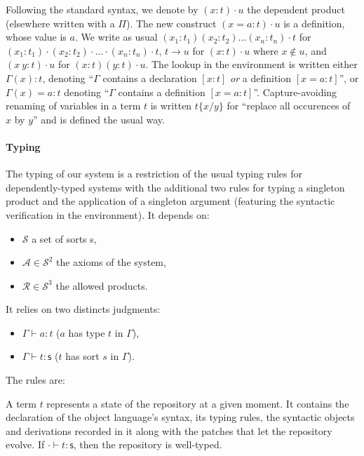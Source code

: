 \documentclass{article}
\newcommand{\sort}{\textsf{s}}
\newcommand{\subst}[2]{\{#1/#2\}}
\begin{document}
Following the standard syntax, we denote by $(x:t)\cdot u$ the
dependent product (elsewhere written with a $\Pi$). The new construct
$(x=a:t)\cdot u$ is a definition, whose value is $a$. We write as
usual $(x_1:t_1)(x_2:t_2)\ldots(x_n:t_n)\cdot t$ for
$(x_1:t_1)\cdot(x_2:t_2)\cdot\ldots\cdot(x_n:t_n)\cdot t$, $t \to u$
for $(x:t)\cdot u$ where $x\notin u$, and $(x\ y : t)\cdot u$ for
$(x:t)(y:t)\cdot u$. The lookup in the environment is written either
$\Gamma(x):t$, denoting ``$\Gamma$ contains a declaration $[x:t]$
\emph{or} a definition $[x=a:t]$'', or $\Gamma(x)=a:t$ denoting
``$\Gamma$ contains a definition $[x=a:t]$''. Capture-avoiding
renaming of variables in a term $t$ is written $t\subst{x}{y}$ for
``replace all occurences of $x$ by $y$'' and is defined the usual way.

\paragraph{Typing} The typing of our system is a restriction of the
usual typing rules for dependently-typed systems with the additional
two rules for typing a singleton product and the application of a
singleton argument (featuring the syntactic verification in the
environment). It depends on: 
\begin{itemize}
  \item$\mathcal S$ a set of sorts \sort,
  \item$\mathcal A \in \mathcal S^2$ the axioms of the system,
  \item$\mathcal R \in \mathcal S^3$ the allowed products.
\end{itemize}
It relies on two distincts judgments:
\begin{itemize}
\item $\Gamma\vdash a : t$ ($a$ has type $t$ in $\Gamma$),
\item $\Gamma\vdash t : \sort$ ($t$ has sort $s$ in $\Gamma$).
\end{itemize}
The rules are:

A term $t$ represents a state of the repository at a given moment. It
contains the declaration of the object language's syntax, its typing
rules, the syntactic objects and derivations recorded in it along with
the patches that let the repository evolve. If $\cdot\vdash t:\sort$,
then the repository is well-typed.





\end{document}
